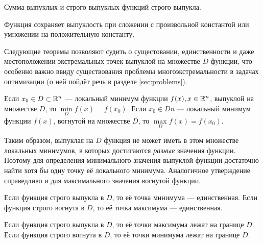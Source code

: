 \begin{thm}
  \label{th:sconvex-f-sum}
  Сумма выпуклых и строго выпуклых функций строго выпукла.
\end{thm}

\begin{thm}
  \label{th:convex-f-factor}
  Функция сохраняет выпуклость при сложении с произвольной константой
  или умножении на положительную константу.
\end{thm}

Следующие теоремы позволяют судить о сущестовании, единственности и
даже местоположении экстремальных точек выпуклой на множестве $D$
функции, что особенно важно ввиду существования проблемы
многоэкстремальности в задачах оптимизации (о ней пойдёт речь в
разделе \ref{sec:problems}).

\begin{thm}
  \label{th:convex-f-locmin}
  Если $x_0 \in D \subset \mathbb{R}^n$ — локальный минимум функции
  $f(x), x \in \mathbb{R}^n$, выпуклой на множестве $D$, то
  $\underset{D}{\min}{f(x)} = f(x_0)$.
  Если $x_0 \in Dn$ — локальный минимум функции $f(x)$, вогнутой на
  множестве $D$, то $\underset{D}{\max}{f(x)} = f(x_0)$.
\end{thm}
Таким образом, выпуклая на $D$ функция не может иметь в этом множестве
локальных минимумов, в которых достигаются \emph{разные} значения
функции. Поэтому для определения минимального значения выпуклой
функции достаточно найти хотя бы одну точку её локального минимума.
Аналогичное утверждение справедливо и для максимального значения
вогнутой функции.

\begin{thm}
  \label{th:convex-f-smin}
  Если функция строго выпукла в $D$, то её точка минимума —
  единственная.
  Если функция строго вогнута в $D$, то её точка максимума —
  единственная.
\end{thm}

\begin{thm}
  \label{th:convex-f-nomax}
  Если функция строго выпукла в $D$, то её точки максимума лежат на
  границе $D$.
  Если функция строго вогнута в $D$, то её точки минимума лежат на
  границе $D$.
\end{thm}
